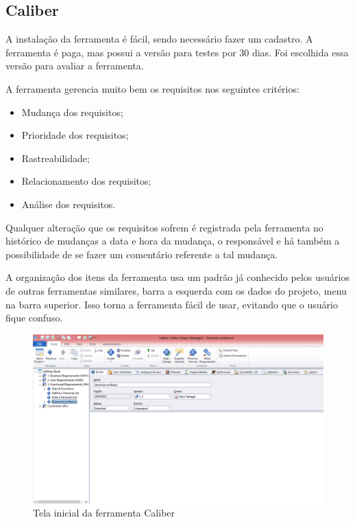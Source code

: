 \subsection{Caliber}
A instalação da ferramenta é fácil, sendo necessário fazer um cadastro. A ferramenta é paga, mas possui a versão para testes por 30 dias. 
Foi escolhida essa versão para avaliar a ferramenta.

A ferramenta gerencia muito bem os requisitos nos seguintes critérios:
\begin{itemize}
  \item Mudança dos requisitos;
  \item Prioridade dos requisitos;
  \item Rastreabilidade;
  \item Relacionamento dos requisitos;
  \item Análise dos requisitos.
\end{itemize}

Qualquer alteração que os requisitos sofrem é registrada pela ferramenta no histórico de mudanças a data e hora da mudança, o responsável e há 
também a possibilidade de se fazer um comentário referente a tal mudança.

A organização dos itens da ferramenta usa um padrão já conhecido pelos usuários de outras ferramentas similares, barra a esquerda com os dados do projeto, 
menu na barra superior. Isso torna a ferramenta fácil de usar, evitando que o usuário fique confuso.

\begin{figure}[!htb]
\centering
\includegraphics[scale=0.4]{figuras/caliber.png}
\caption{Tela inicial da ferramenta Caliber}
\end{figure}
